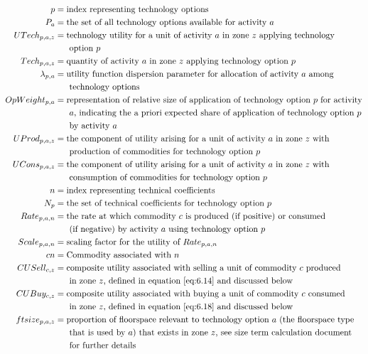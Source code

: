 \begin{align*}
p &= \text{index representing technology options} \\
P_a &= \text{the set of all technology options available for activity $a$} \\
UTech_{p,a,z} &= \text{technology utility for a unit of activity $a$ in zone $z$ applying technology} \\
 &~~~~~\text{option $p$} \\
Tech_{p,a,z} &= \text{quantity of activity $a$ in zone $z$ applying technology option $p$} \\
\lambda_{p,a} &= \text{utility function dispersion parameter for allocation of activity $a$ among} \\
 &~~~~~\text{technology options} \\
OpWeight_{p,a} &= \text{representation of relative size of application of technology option $p$ for activity} \\
 &~~~~~\text{$a$, indicating the a priori expected share of application of technology option $p$} \\
&~~~~~\text{by activity $a$} \\
UProd_{p,a,z} &= \text{the component of utility arising for a unit of activity $a$ in zone $z$ with} \\
 &~~~~~\text{production of commodities for technology option $p$} \\
UCons_{p,a,z} &= \text{the component of utility arising for a unit of activity $a$ in zone $z$ with} \\
 &~~~~~\text{consumption of commodities for technology option $p$} \\
n &= \text{index representing technical coefficients} \\
N_p &= \text{the set of technical coefficients for technology option $p$} \\
Rate_{p,a,n} &= \text{the rate at which commodity $c$ is produced (if positive) or consumed} \\
 &~~~~~\text{(if negative) by activity $a$ using technology option $p$} \\
Scale_{p,a,n} &= \text{scaling factor for the utility of} ~Rate_{p,a,n} \\ 
cn &= \text{Commodity associated with $n$} \\
CUSell_{c,z} &= \text{composite utility associated with selling a unit of commodity $c$ produced} \\
 &~~~~~\text{in zone $z$, defined in equation \ref{eq:6.14} and discussed below} \\
CUBuy_{c,z} &= \text{composite utility associated with buying a unit of commodity $c$ consumed} \\
 &~~~~~\text{in zone $z$, defined in equation \ref{eq:6.18} and discussed below} \\
ftsize_{p,a,z} &= \text{proportion of floorspace relevant to technology option $a$ (the floorspace type} \\
 &~~~~~\text{that is used by $a$) that exists in zone $z$, see size term calculation document} \\
 &~~~~~\text{for further details}
\end{align*}
        
